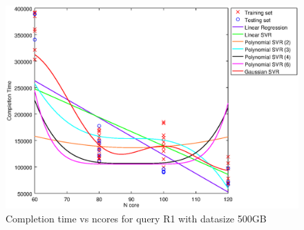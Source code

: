 
\begin {figure}[hbtp]
\centering
\includegraphics[width=\textwidth]{output/R1_500_ONLY_1_LINEAR_NCORE/plot_R1_500.eps}
\caption{Completion time vs ncores for query R1 with datasize 500GB}
\label{fig:only_1_linear_R1_500}
\end {figure}
